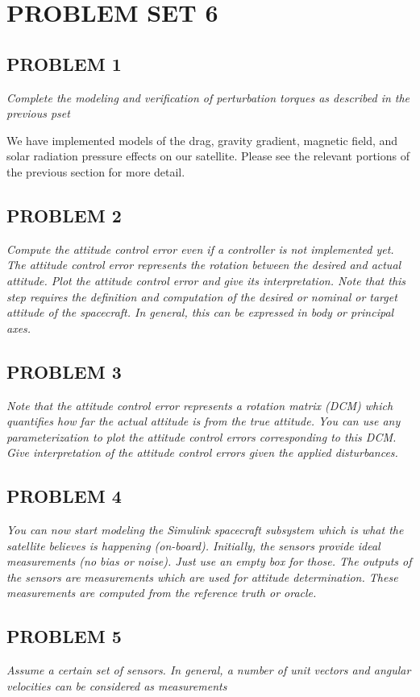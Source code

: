 \section{\Large PROBLEM SET 6}
\subsection{PROBLEM 1}
\textit{Complete the modeling and verification of perturbation torques as described in the previous pset}

We have implemented models of the drag, gravity gradient, magnetic field, and solar radiation pressure effects on our satellite. Please see the relevant portions of the previous section for more detail.


\subsection{PROBLEM 2}
\textit{Compute the attitude control error even if a controller is not implemented yet. The attitude control error represents the rotation between the desired and actual attitude. Plot the attitude control error and give its interpretation. Note that this step requires the definition and computation of the desired or nominal or target attitude of the spacecraft. In general, this can be expressed in body or principal axes.}

\subsection{PROBLEM 3}
\textit{Note that the attitude control error represents a rotation matrix (DCM) which quantifies how far the actual attitude is from the true attitude. You can use any parameterization to plot the attitude control errors corresponding to this DCM. Give interpretation of the attitude control errors given the applied disturbances.}

\subsection{PROBLEM 4}
\textit{You can now start modeling the Simulink spacecraft subsystem which is what the satellite believes is happening (on-board). Initially, the sensors provide ideal measurements (no bias or noise). Just use an empty box for those. The outputs of the sensors are measurements which are used for attitude determination. These measurements are computed from the reference truth or oracle.}

\subsection{PROBLEM 5}
\textit{Assume a certain set of sensors. In general, a number of unit vectors and angular velocities can be considered as measurements}

